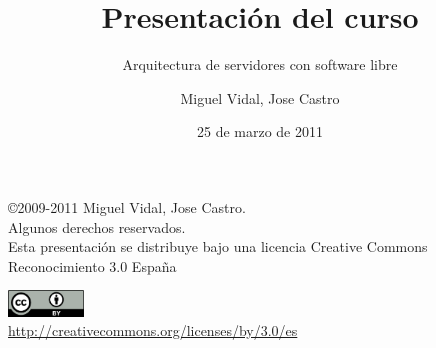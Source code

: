 \documentclass{beamer}
\begin{document}
\title{Presentación del curso}
\subtitle{Arquitectura de servidores con software libre}
\author{Miguel Vidal, Jose Castro}
\date{25 de marzo de 2011}


\begin{frame}
  \vspace{2cm}
  \begin{flushright}
    {\footnotesize \copyright{2009-2011} Miguel Vidal, Jose Castro.} \\
    \vspace{0.25cm}
    {\scriptsize Algunos derechos reservados. \\
    Esta presentación se distribuye bajo una licencia Creative Commons Reconocimiento 3.0 España}\\
    \vspace{0.10cm}
  \end{flushright}
  \begin{center}
    \href{http://creativecommons.org/licenses/by/3.0/es}{\includegraphics[width=2cm]{format/cc-by.png}} \\
    {\tiny \url{http://creativecommons.org/licenses/by/3.0/es}}
  \end{center}
\end{frame}

%
% 
%
%
\end{document}
